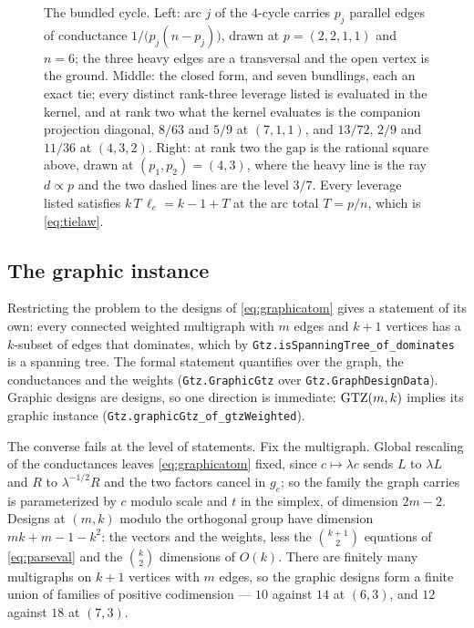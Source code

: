 \begin{figure}[ht]
  \centering
  
  \caption{The bundled cycle.  Left: arc $j$ of the $4$-cycle carries $p_j$
  parallel edges of conductance $1/\bigl(p_j(n-p_j)\bigr)$, drawn at
  $p=(2,2,1,1)$ and $n=6$; the three heavy edges are a transversal and the open
  vertex is the ground.  Middle: the closed form, and seven bundlings, each an
  exact tie; every distinct rank-three leverage listed is evaluated in the
  kernel, and at rank two what the kernel evaluates is the companion projection
  diagonal, $8/63$ and $5/9$ at $(7,1,1)$, and $13/72$, $2/9$ and $11/36$
  at $(4,3,2)$.
  Right: at rank two the gap is the rational square above, drawn at
  $(p_1,p_2)=(4,3)$, where the heavy line is the ray $d\propto p$ and the two
  dashed lines are the level $3/7$.  Every leverage listed satisfies
  $k\,T\,\ell_e=k-1+T$ at the arc total $T=p/n$, which is
  \eqref{eq:tielaw}.}
  \label{fig:bundledcycle}
\end{figure}

\subsection{The graphic instance}\label{app:graphicinstance}

Restricting the problem to the designs of \eqref{eq:graphicatom} gives a
statement of its own: every connected weighted multigraph with $m$ edges and
$k+1$ vertices has a $k$-subset of edges that dominates, which by
\texttt{Gtz.is\allowbreak Spanning\allowbreak Tree\_of\_dominates} is a
spanning tree.  The formal statement quantifies over the graph, the
conductances and the weights (\texttt{Gtz.Graphic\allowbreak Gtz} over
\texttt{Gtz.Graph\allowbreak Design\allowbreak Data}).  Graphic designs are
designs, so one direction is immediate: $\mathrm{GTZ}(m,k)$ implies its graphic
instance (\texttt{Gtz.graphic\allowbreak Gtz\_of\_gtz\allowbreak Weighted}).

The converse fails at the level of statements.  Fix the multigraph.  Global
rescaling of the conductances leaves \eqref{eq:graphicatom} fixed, since
$c\mapsto\lambda c$ sends $L$ to $\lambda L$ and $R$ to $\lambda^{-1/2}R$ and
the two factors cancel in $g_e$; so the family the graph carries is
parameterized by $c$ modulo scale and $t$ in the simplex, of dimension
$2m-2$.  Designs at $(m,k)$ modulo the orthogonal group have dimension
$mk+m-1-k^2$: the vectors and the weights, less the $\binom{k+1}2$ equations
of \eqref{eq:parseval} and the $\binom k2$ dimensions of $O(k)$.  There are
finitely many multigraphs on $k+1$ vertices with $m$ edges, so the graphic
designs form a finite union of families of positive codimension --- $10$
against $14$ at $(6,3)$, and $12$ against $18$ at $(7,3)$.

